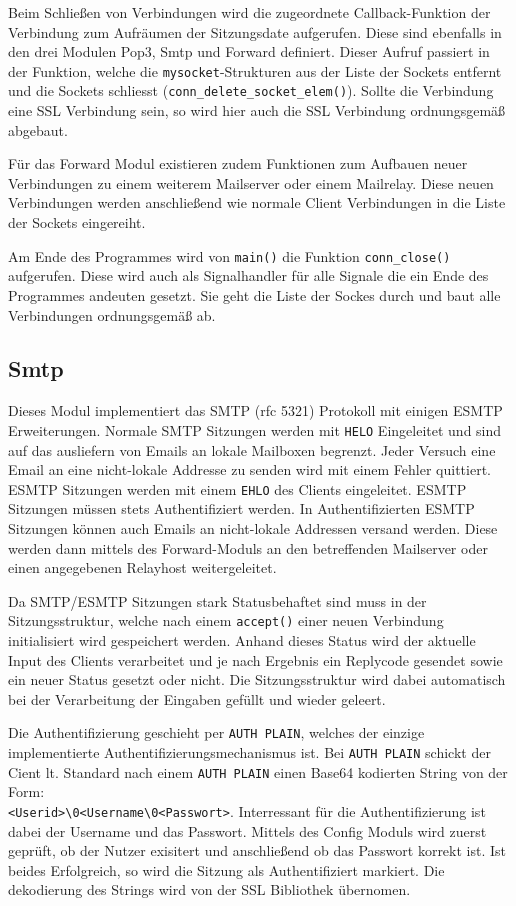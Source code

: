 \documentclass[final,a4paper,11pt,notitlepage,halfparskip]{scrreprt}
\begin{document}
Beim Schließen von Verbindungen wird die zugeordnete Callback-Funktion der
Verbindung zum Aufräumen der Sitzungsdate aufgerufen. Diese sind ebenfalls in
den drei Modulen Pop3, Smtp und Forward definiert. Dieser Aufruf passiert in der
Funktion, welche die \texttt{mysocket}-Strukturen aus der Liste der Sockets
entfernt und die Sockets schliesst (\texttt{conn\_delete\_socket\_elem()}).
Sollte die Verbindung eine SSL Verbindung sein, so wird hier auch die SSL
Verbindung ordnungsgemäß abgebaut.

Für das Forward Modul existieren zudem Funktionen zum Aufbauen neuer Verbindungen
zu einem weiterem Mailserver oder einem Mailrelay. Diese neuen Verbindungen
werden anschließend wie normale Client Verbindungen in die Liste der Sockets
eingereiht.

Am Ende des Programmes wird von \texttt{main()} die Funktion 
\texttt{conn\_close()} aufgerufen. Diese wird auch als Signalhandler für alle
Signale die ein Ende des Programmes andeuten gesetzt. Sie geht die Liste der
Sockes durch und baut alle Verbindungen ordnungsgemäß ab.


\subsection{Smtp}
Dieses Modul implementiert das SMTP (rfc 5321) Protokoll mit einigen ESMTP 
Erweiterungen. Normale SMTP Sitzungen werden mit \texttt{HELO} Eingeleitet und
sind auf das ausliefern von Emails an lokale Mailboxen begrenzt. Jeder Versuch
eine Email an eine nicht-lokale Addresse zu senden wird mit einem Fehler
quittiert. ESMTP Sitzungen werden mit einem \texttt{EHLO} des Clients
eingeleitet. ESMTP Sitzungen müssen stets Authentifiziert werden. In
Authentifizierten ESMTP Sitzungen können auch Emails an nicht-lokale Addressen
versand werden. Diese werden dann mittels des Forward-Moduls an den betreffenden
Mailserver oder einen angegebenen Relayhost weitergeleitet.

Da SMTP/ESMTP Sitzungen stark Statusbehaftet sind muss in der Sitzungsstruktur,
welche nach einem \texttt{accept()} einer neuen Verbindung initialisiert wird
gespeichert werden. Anhand dieses Status wird der aktuelle Input des Clients
verarbeitet und je nach Ergebnis ein Replycode gesendet sowie ein neuer Status 
gesetzt oder nicht. Die Sitzungsstruktur wird dabei automatisch bei der
Verarbeitung der Eingaben gefüllt und wieder geleert.

Die Authentifizierung geschieht per \texttt{AUTH PLAIN}, welches der einzige
implementierte Authentifizierungsmechanismus ist. Bei \texttt{AUTH PLAIN}
schickt der Cient lt. Standard nach einem \texttt{AUTH PLAIN} einen Base64
kodierten String von der Form:\\
\texttt{<Userid>\textbackslash0<Username\textbackslash0<Passwort>}. 
Interressant für die Authentifizierung ist dabei der Username und das Passwort.
Mittels des Config Moduls wird zuerst geprüft, ob der Nutzer exisitert und
anschließend ob das Passwort korrekt ist. Ist beides Erfolgreich, so wird die
Sitzung als Authentifiziert markiert. Die dekodierung des Strings wird von der
SSL Bibliothek übernomen.
\end{document}
